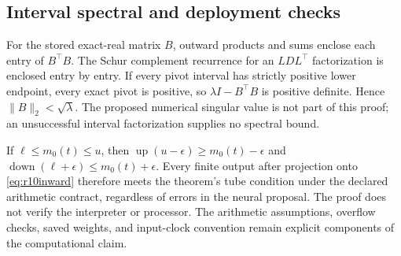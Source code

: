 \subsection{Interval spectral and deployment checks}
For the stored exact-real matrix $B$, outward products and sums enclose each entry of $B^\top B$. The Schur complement recurrence for an $LDL^\top$ factorization is enclosed entry by entry. If every pivot interval has strictly positive lower endpoint, every exact pivot is positive, so $\lambda I-B^\top B$ is positive definite. Hence $\|B\|_2<\sqrt\lambda$. The proposed numerical singular value is not part of this proof; an unsuccessful interval factorization supplies no spectral bound.

If $\ell\leq m_0(t)\leq u$, then
$\operatorname{up}(u-\epsilon)\geq m_0(t)-\epsilon$ and
$\operatorname{down}(\ell+\epsilon)\leq m_0(t)+\epsilon$.
Every finite output after projection onto \eqref{eq:r10inward} therefore meets the theorem's tube condition under the declared arithmetic contract, regardless of errors in the neural proposal. The proof does not verify the interpreter or processor. The arithmetic assumptions, overflow checks, saved weights, and input-clock convention remain explicit components of the computational claim.

